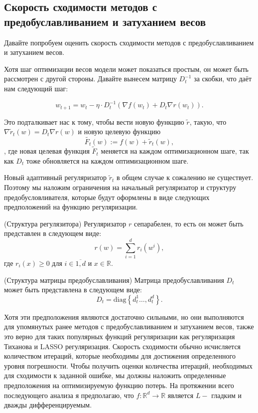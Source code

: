 \subsection{Скорость сходимости методов с предобуславливанием и затуханием весов}

Давайте попробуем оценить скорость сходимости методов с предобуславливанием и затуханием весов. 

Хотя шаг оптимизации весов модели может показаться простым, он может быть рассмотрен с другой стороны. Давайте вынесем матрицу $D_t^{-1}$ за скобки, что даёт нам следующий шаг:

\begin{equation}
w_{t+1} = w_t - \eta \cdot D_t^{-1} (\nabla f(w_t) + D_t \nabla r(w_t)).
\end{equation}

Это подталкивает нас к тому, чтобы вести новую функцию $\tilde{r}$, такую, что $\nabla \tilde{r}_t(w) = D_t \nabla r(w)$ и новую целевую функцию
\begin{equation} \label{F_tilde}
    \tilde{F_t}(w) := f(w) + \tilde{r}_t(w),
\end{equation}
, где новая целевая функция $\widetilde{F}_t$ меняется на каждом оптимизационном шаге, так как $D_t$ тоже обновляется на каждом оптимизационном шаге.

Новый адаптивный регуляризатор $\widetilde{r}_t$ в общем случае к сожалению не существует. Поэтому мы наложим ограничения на начальный регуляризатор и структуру предобусловливателя, которые будут оформлены в виде следующих предположений на функцию регуляризации.

\begin{assumption}{(Структура регулязитора)}
    \label{ass:regstruct}
    Регуляризатор $r$ сепарабелен, то есть он может быть представлен в следующем виде:
    $$r(w) = \sum_{i=1}^d r_i(w^i),$$
    где $r_i(x) \ge 0$ для $i \in \overline{1, d}$ и $x \in \mathbb{R}$.
\end{assumption}

\begin{assumption}{(Структура матрицы предобуславливания)}
    \label{ass:precondstruct}
    Матрица предобуславливания $D_t$ может быть представлена в следующем виде:
    $$ D_t = \textrm{diag} \left\{ d_t^1 \ldots, d
_t^d \right\}.$$
\end{assumption}

Хотя эти предположения являются достаточно сильными, но они выполняются для упомянутых ранее методов с предобуславливанием и затуханием весов, также это верно для таких популярных функций регуляризации как регуляризация Тиханова и LASSO регуляризация. 
Скорость сходимости обычно исчисляется количеством итераций, которые необходимы для достижения определенного уровня погрешности. Чтобы получить оценки количества итераций, необходимых для сходимости к заданной ошибке, мы должны наложить определенные предположения на оптимизируемую функцию потерь. На протяжении всего последующего анализа я предполагаю, что $f : \mathbb{R}^d \rightarrow \mathbb{R}$ является $L-$ гладким и дважды дифференцируемым.

